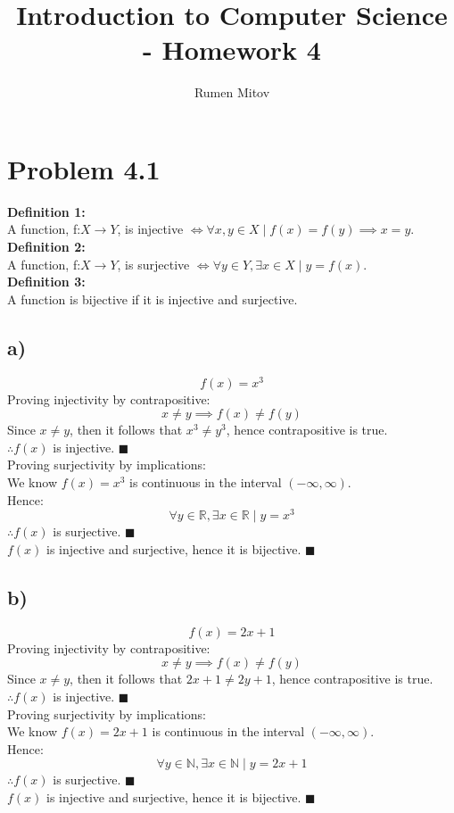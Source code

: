\documentclass{article}
\title{\vspace{-2cm}Introduction to Computer Science - Homework 4}
\author{Rumen Mitov}
\begin{document}
\maketitle

\section*{Problem 4.1}
\textbf{Definition 1:} \\
A function, f:$X \rightarrow Y$, is injective $\iff \forall x,y \in X \mid f(x) = f(y) \implies x = y $. \\
\textbf{Definition 2:} \\
A function, f:$X \rightarrow Y$, is surjective $\iff \forall y \in Y, \exists x \in X \mid y = f(x) $. \\
\textbf{Definition 3:} \\
A function is bijective if it is injective and surjective. \\

\subsection*{a)}
\[
    f(x) = x^3
\]
Proving injectivity by contrapositive:
\[
    x \neq y \implies f(x) \neq f(y)
\]
Since $x \neq y$, then it follows that $x^3 \neq y^3$, hence contrapositive is true. \\
$\therefore f(x)$ is injective. $\blacksquare$ \\
\newline
Proving surjectivity by implications: \\
We know $f(x) = x^3$ is continuous in the interval $(-\infty, \infty)$. \\
Hence: \\
\[
    \forall y \in \mathbb{R}, \exists x \in \mathbb{R} \mid y = x^3
\]
$\therefore f(x)$ is surjective. $\blacksquare$ \\
\newline
$f(x)$ is injective and surjective, hence it is bijective. $\blacksquare$ \\

\subsection*{b)}
\[
    f(x) = 2x + 1
\]
Proving injectivity by contrapositive:
\[
    x \neq y \implies f(x) \neq f(y)
\]
Since $x \neq y$, then it follows that $2x + 1 \neq 2y + 1$, hence contrapositive is true. \\
$\therefore f(x)$ is injective. $\blacksquare$ \\
\newline
Proving surjectivity by implications: \\
We know $f(x) = 2x + 1$ is continuous in the interval $(-\infty, \infty)$. \\
Hence: \\
\[
    \forall y \in \mathbb{N}, \exists x \in \mathbb{N} \mid y = 2x + 1
\]
$\therefore f(x)$ is surjective. $\blacksquare$ \\
\newline
$f(x)$ is injective and surjective, hence it is bijective. $\blacksquare$ \\
\end{document}
